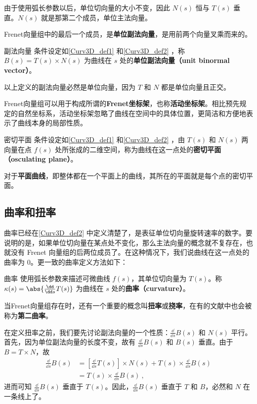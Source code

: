 由于使用弧长参数以后，单位切向量的大小不变，因此 $N(s)$ 恒与 $T(s)$ 垂直。$N(s)$ 就是那第二个成员，单位主法向量。

Frenet向量组中的最后一个成员，是\textbf{单位副法向量}，是用前两个向量叉乘而来的。

\begin{definition}{副法向量}
条件设定如\autoref{Curv3D_def1} 和\autoref{Curv3D_def2} ，称 $B(s)=T(s)\times N(s)$ 为曲线在 $s$ 处的\textbf{单位副法向量（unit binormal vector）}。
\end{definition}

以上定义的副法向量必然是单位向量，因为 $T$ 和 $N$ 都是单位向量且正交。

Frenet向量组可以用于构成所谓的\textbf{Frenet坐标架}，也称\textbf{活动坐标架}。相比预先规定的自然坐标系，活动坐标架忽略了曲线在空间中的具体位置，更简洁和方便地表示了曲线本身的局部性质。

\begin{definition}{密切平面}
条件设定如\autoref{Curv3D_def1} 和\autoref{Curv3D_def2} ，由 $T(s)$ 和 $N(s)$ 两向量在点 $f(s)$ 处所张成的二维空间，称为曲线在这一点处的\textbf{密切平面（osculating plane）}。
\end{definition}

对于\textbf{平面曲线}，即整体都在一个平面上的曲线，其所在的平面就是每个点的密切平面。

\subsection{曲率和扭率}

曲率已经在\autoref{Curv3D_def2} 中定义清楚了，是表征单位切向量旋转速率的数字。要说明的是，如果单位切向量在某点处不变化，那么主法向量的概念就不复存在，也就没有 Frenet 向量组的后两位成员了。在这种情况下，我们说曲线在这一点处的曲率为 $0$。更一致的曲率定义方法如下：
\begin{definition}{曲率}
使用弧长参数来描述可微曲线 $f(s)$，其单位切向量为 $T(s)$。称 $\kappa(s)=\abs{\frac{\dd}{\dd s}T(s)}$ 为曲线在 $s$ 处的\textbf{曲率（curvature）}。
\end{definition}

当Frenet向量组存在时，还有一个重要的概念叫\textbf{扭率}或\textbf{挠率}，在有的文献中也会被称为\textbf{第二曲率}。

在定义扭率之前，我们要先讨论副法向量的一个性质：$\frac{\dd}{\dd s}B(s)$ 和 $N(s)$ 平行。首先，因为单位副法向量的长度不变，故有 $\frac{\dd}{\dd s}B(s)$ 和 $B(s)$ 垂直。由于 $B=T\times N$，故 
\begin{equation}
\begin{aligned}
\frac{\dd}{\dd s}B(s)&=[\frac{\dd}{\dd s}T(s)]\times N(s)+T(s)\times\frac{\dd}{\dd s}B(s)\\&=T(s)\times\frac{\dd}{\dd s}B(s)~,
\end{aligned}
\end{equation}
进而可知 $\frac{\dd}{\dd s}B(s)$ 垂直于 $T(s)$。因此，$\frac{\dd}{\dd s}B(s)$ 垂直于 $T$ 和 $B$，必然和 $N$ 在一条线上了。

